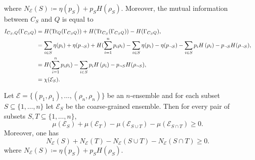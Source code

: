 \documentclass[notitlepage, 10pt]{article}
\begin{document}
where $N_{\mathcal E}(S) \coloneqq \eta(p_{S}) + p_{S}H(\rho_{S})$.
Moreover, the mutual information between $C_S$ and $Q$ is equal to
\begin{align}
    I_{C_S, Q}(\Gamma_{C_SQ}) 
    &= H(\operatorname{Tr}_{Q}(\Gamma_{C_SQ})) + H(\operatorname{Tr}_{C_S}(\Gamma_{C_SQ})) - H(\Gamma_{C_SQ}), \\
    &= \sum_{i\in S} \eta(p_i) + \eta(p_{\neg S}) + H(\sum_{i=1}^{n} p_i \rho_i) - \sum_{i\in S} \eta(p_i) - \eta(p_{\neg S}) - \sum_{i\in S} p_i H\left(\rho_i\right) - p_{\neg S}H(\rho_{\neg S}), \\
    &= H(\sum_{i=1}^{n} p_i \rho_i) - \sum_{i\in S} p_i H\left(\rho_i\right) - p_{\neg S}H(\rho_{\neg S}), \\
    &= \chi(\mathcal E_S).
\end{align}
\begin{thm}
    Let $\mathcal E = \{(p_1, \rho_1), \ldots, (\rho_n, \rho_n) \}$ be an $n$-ensemble and for each subset $S \subseteq \{1, \ldots, n\}$ let $\mathcal E_{S}$ be the coarse-grained ensemble.
    Then for every pair of subsets $S,T \subseteq \{1, \ldots, n\}$,
    \begin{equation}
        \mu(\mathcal E_{S}) + \mu(\mathcal E_{T}) - \mu(\mathcal E_{S\cup T}) - \mu(\mathcal E_{S\cap T}) \geq 0.
        \label{eq:mu_SSA}
    \end{equation}
    Moreover, one has
    \begin{equation}
         N_{\mathcal E}(S) + N_{\mathcal E}(T) - N_{\mathcal E}(S\cup T) - N_{\mathcal E}(S\cap T) \geq 0.
         \label{eq:N_SSA}
    \end{equation}
    where $N_{\mathcal E}(S) \coloneqq \eta(p_{S}) + p_{S}H(\rho_{S})$.
\end{thm}
\end{document}
